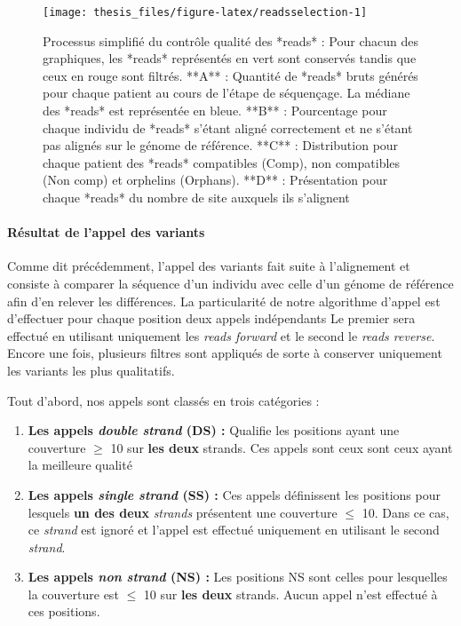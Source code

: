 \documentclass[12pt,twoside]{reedthesis}
\providecommand{\tightlist}{%
  \setlength{\itemsep}{0pt}\setlength{\parskip}{0pt}}
\theoremstyle{definition}
\theoremstyle{definition}
\theoremstyle{remark}
\begin{document}
  \begin{figure}
  
  {\centering \texttt{[image: thesis\_files/figure-latex/readsselection-1]} 
  
  }
  
  \caption[Processus simplifié du contrôle qualité des *reads*]{Processus simplifié du contrôle qualité des *reads* : Pour chacun des graphiques, les *reads* représentés en vert sont conservés tandis que ceux en rouge sont filtrés. **A** : Quantité de *reads* bruts générés pour chaque patient au cours de l'étape de séquençage. La médiane des *reads* est représentée en bleue. **B** : Pourcentage pour chaque individu de *reads* s'étant aligné correctement et ne s'étant pas alignés sur le génome de référence. **C** : Distribution pour chaque patient des *reads* compatibles (Comp), non compatibles (Non comp) et orphelins (Orphans). **D** : Présentation pour chaque *reads* du nombre de site auxquels ils s'alignent}\label{fig:readsselection}
  \end{figure}
  
  \newpage
  
  \paragraph{Résultat de l'appel des
  variants}\label{resultat-de-lappel-des-variants}
  
  Comme dit précédemment, l'appel des variants fait suite à l'alignement
  et consiste à comparer la séquence d'un individu avec celle d'un génome
  de référence afin d'en relever les différences. La particularité de
  notre algorithme d'appel est d'effectuer pour chaque position deux
  appels indépendants Le premier sera effectué en utilisant uniquement les
  \emph{reads forward} et le second le \emph{reads reverse}. Encore une
  fois, plusieurs filtres sont appliqués de sorte à conserver uniquement
  les variants les plus qualitatifs.
  
  Tout d'abord, nos appels sont classés en trois catégories :
  
  \begin{enumerate}
  \def\labelenumi{\arabic{enumi}.}
  \tightlist
  \item
    \textbf{Les appels \emph{double strand} (DS) :} Qualifie les positions
    ayant une couverture \(\ge\) 10 sur \textbf{les deux} strands. Ces
    appels sont ceux sont ceux ayant la meilleure qualité
  \item
    \textbf{Les appels \emph{single strand} (SS) :} Ces appels définissent
    les positions pour lesquels \textbf{un des deux} \emph{strands}
    présentent une couverture \(\le\) 10. Dans ce cas, ce \emph{strand}
    est ignoré et l'appel est effectué uniquement en utilisant le second
    \emph{strand}.\\
  \item
    \textbf{Les appels \emph{non strand} (NS) :} Les positions NS sont
    celles pour lesquelles la couverture est \(\le\) 10 sur \textbf{les
    deux} strands. Aucun appel n'est effectué à ces positions.
  \end{enumerate}
  
\end{document}
